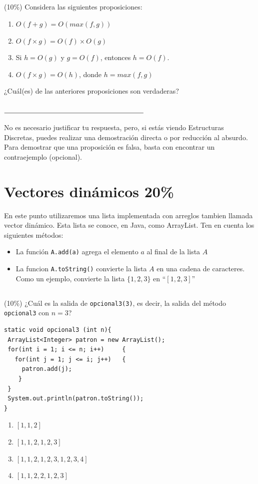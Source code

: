 \documentclass[10 pt]{article}
\begin{document}
\begin{multicols}{2}
\subsection{} (10\%) Considera las siguientes proposiciones:
\begin{enumerate}[label=\Alph*]
	\item $O(f + g) = O(max(f,g))$
	\item $O(f \times g) = O(f) \times O(g)$
	\item Si $h = O(g)$ y $g = O(f)$, entonces $h = O(f)$.
	\item $O(f \times g) = O(h)$, donde $h = max(f,g)$
\end{enumerate}
¿Cuál(es) de las anteriores proposiciones son verdaderas?  \\ \\
$\rule{7cm}{0.15mm}$

No es necesario 
justificar tu respuesta, pero, si estás viendo Estructuras Discretas, puedes
realizar una demostración directa o por reducción al absurdo. Para 
demostrar que una proposición es falsa, basta con encontrar un contraejemplo  (opcional).
\section{Vectores dinámicos 20\%}
En este punto utilizaremos una lista implementada con arreglos tambien llamada vector dinámico. 
Esta lista se conoce, en Java, como ArrayList. Ten en cuenta los
siguientes métodos:

\begin{itemize}
	\item La función \texttt{A.add(a)} agrega el elemento $a$ al final de la lista $A$
	\item La funcion \texttt{A.toString()} convierte la lista $A$ en una cadena de caracteres.  Como un ejemplo, convierte la lista $\{1,2,3\}$ en ``$\left[1, 2 ,3\right]$''
\end{itemize}

\subsection{} (10\%) ¿Cuál es la salida de \texttt{opcional3(3)}, es decir, la salida del método \texttt{opcional3} con $n=3$?
\begin{lstlisting}
static void opcional3 (int n){
 ArrayList<Integer> patron = new ArrayList();   
 for(int i = 1; i <= n; i++)     { 
   for(int j = 1; j <= i; j++)   {
     patron.add(j);              
    }
 }
 System.out.println(patron.toString());
}
\end{lstlisting}
\begin{enumerate}[label=\alph*]
	\item $\left[1, 1, 2\right]$
	\item $\left[1, 1, 2, 1, 2, 3\right]$ 
	\item $\left[1, 1, 2, 1, 2, 3, 1, 2, 3, 4\right]$
	\item $\left[1, 1, 2, 2, 1, 2, 3\right]$
\end{enumerate}

\end{multicols}
\end{document}
